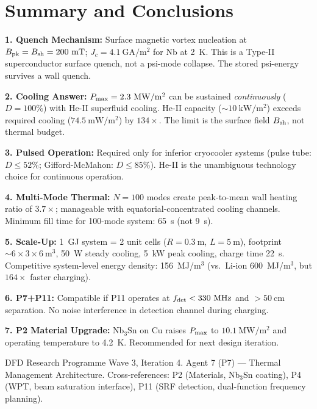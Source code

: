\documentclass[aps,prd,twocolumn,superscriptaddress]{revtex4-2}
\newcommand{\Pmax}{P_{\rm max}}
\begin{document}
\section{Summary and Conclusions}
\label{sec:conclusions}

\begin{tcolorbox}[title=W3i4 P7 Engineering Conclusions]
\textbf{1. Quench Mechanism:} Surface magnetic vortex nucleation at
$B_{\rm pk} = B_{\rm sh} = 200~\mathrm{mT}$; $J_c = 4.1~\mathrm{GA/m^2}$
for Nb at 2~K. This is a Type-II superconductor surface quench, not a
psi-mode collapse. The stored psi-energy survives a wall quench.

\textbf{2. Cooling Answer:} $\Pmax = 2.3~\mathrm{MW/m^2}$ can be
sustained \emph{continuously} ($D = 100\%$) with He-II superfluid
cooling. He-II capacity ($\sim 10~\mathrm{kW/m^2}$) exceeds required
cooling ($74.5~\mathrm{mW/m^2}$) by $134\times$. The limit is the
surface field $B_{\rm sh}$, not thermal budget.

\textbf{3. Pulsed Operation:} Required only for inferior cryocooler
systems (pulse tube: $D \leq 52\%$; Gifford-McMahon: $D \leq 85\%$).
He-II is the unambiguous technology choice for continuous operation.

\textbf{4. Multi-Mode Thermal:} $N=100$ modes create peak-to-mean wall
heating ratio of $3.7\times$; manageable with equatorial-concentrated
cooling channels. Minimum fill time for 100-mode system: 65~s (not 9~s).

\textbf{5. Scale-Up:} 1~GJ system = 2 unit cells ($R=0.3~\mathrm{m}$,
$L=5~\mathrm{m}$), footprint $\sim 6\times 3\times 6~\mathrm{m}^3$,
50~W steady cooling, 5~kW peak cooling, charge time 22~s. Competitive
system-level energy density: 156~MJ/m$^3$ (vs.\ Li-ion 600~MJ/m$^3$,
but $164\times$ faster charging).

\textbf{6. P7+P11:} Compatible if P11 operates at $f_{\rm det}
< 330~\mathrm{MHz}$ and $> 50~\mathrm{cm}$ separation. No noise
interference in detection channel during charging.

\textbf{7. P2 Material Upgrade:} Nb$_3$Sn on Cu raises $\Pmax$ to
$10.1~\mathrm{MW/m^2}$ and operating temperature to 4.2~K.
Recommended for next design iteration.
\end{tcolorbox}

\begin{acknowledgments}
DFD Research Programme Wave 3, Iteration 4.
Agent 7 (P7) --- Thermal Management Architecture.
Cross-references: P2 (Materials, Nb$_3$Sn coating),
P4 (WPT, beam saturation interface),
P11 (SRF detection, dual-function frequency planning).
\end{acknowledgments}
\end{document}

